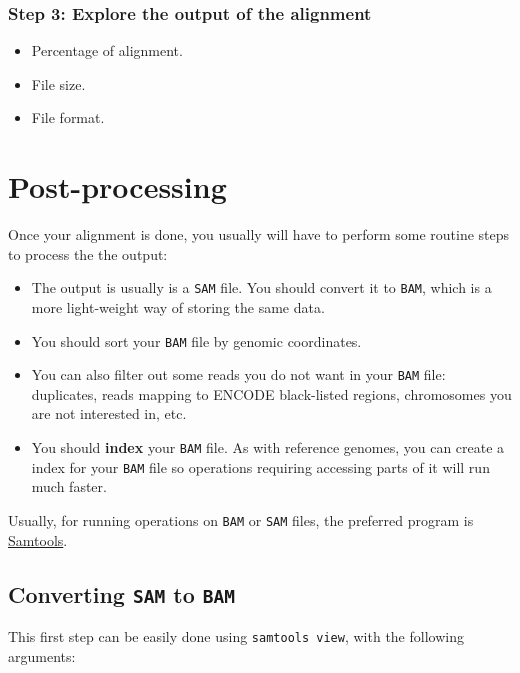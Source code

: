 \documentclass[]{article}
\providecommand{\tightlist}{%
  \setlength{\itemsep}{0pt}\setlength{\parskip}{0pt}}
\begin{document}
\subsubsection{Step 3: Explore the output of the
alignment}\label{step-3-explore-the-output-of-the-alignment}

\begin{itemize}
\tightlist
\item
  Percentage of alignment.
\item
  File size.
\item
  File format.
\end{itemize}

\section{Post-processing}\label{post-processing}

Once your alignment is done, you usually will have to perform some
routine steps to process the the output:

\begin{itemize}
\tightlist
\item
  The output is usually is a \texttt{SAM} file. You should convert it to
  \texttt{BAM}, which is a more light-weight way of storing the same
  data.
\item
  You should sort your \texttt{BAM} file by genomic coordinates.
\item
  You can also filter out some reads you do not want in your
  \texttt{BAM} file: duplicates, reads mapping to ENCODE black-listed
  regions, chromosomes you are not interested in, etc.
\item
  You should \textbf{index} your \texttt{BAM} file. As with reference
  genomes, you can create a index for your \texttt{BAM} file so
  operations requiring accessing parts of it will run much faster.
\end{itemize}

Usually, for running operations on \texttt{BAM} or \texttt{SAM} files,
the preferred program is \href{http://www.htslib.org/}{Samtools}.

\subsection{\texorpdfstring{Converting \texttt{SAM} to
\texttt{BAM}}{Converting SAM to BAM}}\label{converting-sam-to-bam}

This first step can be easily done using \texttt{samtools\ view}, with
the following arguments:
\end{document}
